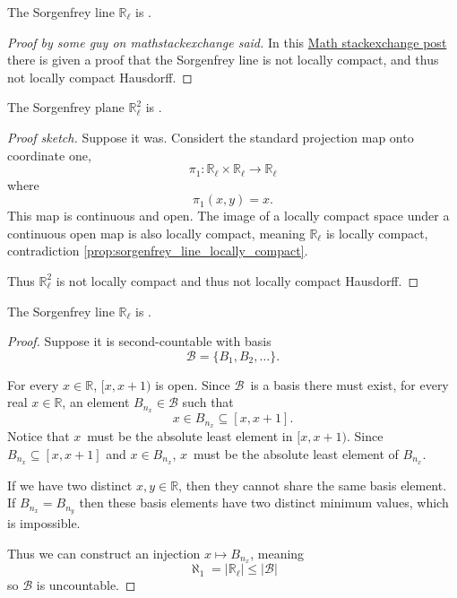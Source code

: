 \documentclass[11pt]{article}
\begin{document}
\begin{prop}\label{prop:sorgenfrey_line_locally_compact}
    The Sorgenfrey line $\mathbb R_\ell$ is 
    . 
\end{prop}
\begin{proof}[Proof by some guy on mathstackexchange said]
    In this 
    \href{https://math.stackexchange.com/questions/169896/how-to-prove-that-compact-subspaces-of-the-sorgenfrey-line-are-countable/170709#170709}{Math stackexchange post} there is given a proof that 
    the Sorgenfrey line is not locally compact, and thus 
    not locally compact Hausdorff. 
\end{proof}

\begin{cor}\label{cor:sorgenfrey_plane_locally_compact}
    The Sorgenfrey plane $\mathbb R^2_\ell$ is 
    . 
\end{cor}
\begin{proof}[Proof sketch]
    Suppose it was. 
    Considert the standard projection map 
    onto coordinate one, 
    \[
        \pi_1 : \mathbb R_\ell \times \mathbb R_\ell 
        \to \mathbb R_\ell
    \]
    where 
    \[
        \pi_1(x,y) = x.  
    \]
    This map is continuous and open. 
    The image of a locally compact space 
    under a continuous open map is also 
    locally compact, meaning $\mathbb R_\ell$ is locally compact, 
    contradiction \cref{prop:sorgenfrey_line_locally_compact}. 

    Thus $\mathbb R^2_\ell$ is not locally compact and thus 
    not locally compact Hausdorff. 
\end{proof}

\begin{prop}\label{prop:sorgenfrey_line_second_countable}
    The Sorgenfrey line $\mathbb R_\ell$ is .
\end{prop}
\begin{proof}
    Suppose it is second-countable with 
    basis 
    \[
        \mathcal B = \{B_1,B_2,\ldots\}.
    \]

    For every $x \in \mathbb R$, 
    $[x,x+1)$ is open. 
    Since $\mathcal B$ is a basis there must exist, 
    for every real $x \in \mathbb R$, an element $B_{n_x} \in 
    \mathcal B$ such that 
    \[
        x \in B_{n_x} \subseteq [x,x+1]. 
    \]
    Notice that $x$ must be the absolute least element 
    in $[x,x+1)$. Since $B_{n_x} \subseteq [x,x+1]$ and 
    $x \in B_{n_x}$, $x$ must be the absolute least element 
    of $B_{n_x}$. 
    
    If we have two distinct $x,y \in \mathbb R$, then 
    they cannot share the same basis element. 
    If $B_{n_x} = B_{n_y}$ then these 
    basis elements have two distinct minimum values, 
    which is impossible. 

    Thus we can construct an injection 
    $x \mapsto B_{n_x}$, meaning 
    \[
        \aleph_1 = |\mathbb R_\ell| \leq |\mathcal B| 
    \]
    so $\mathcal B$ is uncountable. 
\end{proof}
\end{document}
